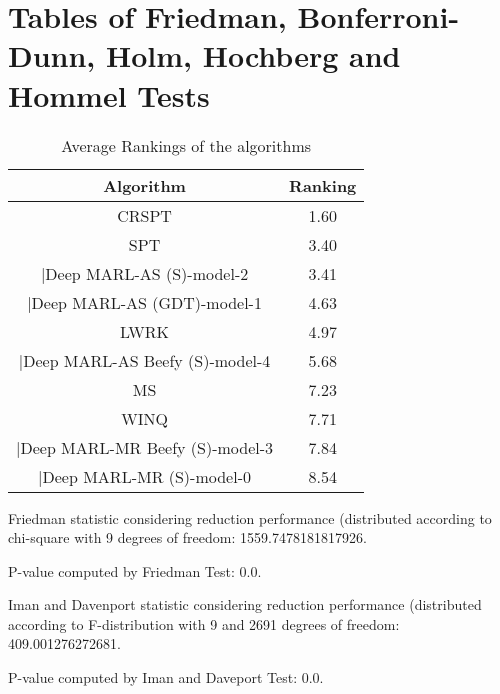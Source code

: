 \documentclass[a3paper,10pt]{article}
\author{}
\date{\today}
\begin{document}
\oddsidemargin 0in \topmargin 0in\maketitle
\section{Tables of Friedman, Bonferroni-Dunn, Holm, Hochberg and Hommel Tests}
\begin{table}[!htp]
\centering
\caption{Average Rankings of the algorithms
}\begin{tabular}{c|c}
Algorithm&Ranking\\
\hline
CRSPT&1.60\\
SPT&3.40\\
|Deep MARL-AS (S)-model-2&3.41\\
|Deep MARL-AS (GDT)-model-1&4.63\\
LWRK&4.97\\
|Deep MARL-AS Beefy (S)-model-4&5.68\\
MS&7.23\\
WINQ&7.71\\
|Deep MARL-MR Beefy (S)-model-3&7.84\\
|Deep MARL-MR (S)-model-0&8.54\\
\end{tabular}
\end{table}


Friedman statistic considering reduction performance (distributed according to chi-square with 9 degrees of freedom: 1559.7478181817926.


P-value computed by Friedman Test: 0.0.\newline

Iman and Davenport statistic considering reduction performance (distributed according to F-distribution with 9 and 2691 degrees of freedom: 409.001276272681.


P-value computed by Iman and Daveport Test: 0.0.\newline
\end{document}
